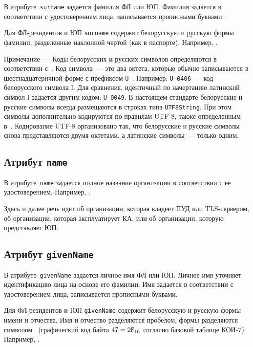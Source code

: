 В атрибуте~\texttt{surname} задается фамилия ФЛ или ЮП.
Фамилия задается в соответствии с удостоверением лица,
записывается прописными буквами.

Для ФЛ-резидентов и ЮП \texttt{surname} содержит белорусскую и русскую 
формы фамилии, разделенные наклонной чертой (как в паспорте).
Например, .

\begin{note} 
Примечание~--- Коды белорусских и русских символов определяются 
в соответствии с~\cite{UTF8}. Код символа~--- это два октета,
которые обычно записываются в шестнадцатеричной форме с префиксом
\texttt{U-}. Например, \texttt{U-0406}~--- код белорусского символа І.
Для сравнения, идентичный по начертанию латинский символ I 
задается другим кодом: \texttt{U-0049}.
%
В настоящем стандарте белорусские и русские символы 
всегда размещаются в строках типа \texttt{UTF8String}.
%
При этом символы дополнительно кодируются по правилам UTF-8, также 
определенным в~\cite{UTF8}. Кодирование UTF-8 организовано так, что 
белорусские и русские символы снова представляются двумя октетами, 
а латинские символы~--- только одним.
\end{note}

\subsection{Атрибут \texttt{name}}\label{ENTITIES.Id.N}

В атрибуте~\texttt{name} задается полное название организации
в соответствии с ее удостоверением. Например, .  

Здесь и далее речь идет об организации,
которая владеет ПУД или TLS-сервером, 
об организации, которая эксплуатирует КА,
или об организации, которую представляет ЮП.

\subsection{Атрибут \texttt{givenName}}\label{ENTITIES.Id.GN}

В атрибуте~\texttt{givenName} задается личное имя ФЛ или ЮП.
Личное имя уточняет идентификацию лица на основе его фамилии.
%
Имя задается в соответствии с удостоверением лица, 
записывается прописными буквами. 

Для ФЛ-резидентов и ЮП \texttt{givenName} содержит белорусскую и русскую 
формы имени и отчества. Имя и отчество разделяются пробелом, формы 
разделяются символом~\str{/} (графический код байта $47=\texttt{2F}_{16}$ 
согласно базовой таблице КОИ-7). 
Например, .

